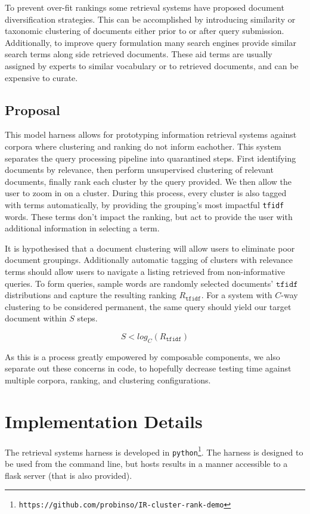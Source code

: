 \documentclass[11pt]{article}
\def\site{\texttt{https://github.com/probinso/IR-cluster-rank-demo}\xspace}
\def\tfidf{\texttt{tfidf}\xspace}
\def\python{\texttt{python}\xspace}
\begin{document}
To prevent over-fit rankings some retrieval systems have proposed document diversification
strategies\cite{Zhu2014}. This can be accomplished by introducing similarity or
taxonomic clustering of documents either prior to or after query submission. Additionally,
to improve query formulation many search engines provide similar search terms along side
retrieved documents. These aid terms are usually assigned by experts to similar vocabulary
or to retrieved documents, and can be expensive to curate.

\subsection{Proposal}
This model harness allows for prototyping information retrieval systems against
corpora where clustering and ranking do not inform eachother.
This system separates the query processing pipeline into quarantined
steps. First identifying documents by relevance, then perform unsupervised clustering
of relevant documents, finally rank each cluster by the query provided. We then allow
the user to zoom in on a cluster. During this process, every cluster is also tagged with
terms automatically, by providing the grouping's most impactful \tfidf words. These terms
don't impact the ranking, but act to provide the user with additional information in
selecting a term.

It is hypothesised that a document clustering will allow users to eliminate poor document
groupings. Additionally automatic tagging of clusters with relevance terms should allow
users to navigate a listing retrieved from non-informative queries. To form queries,
sample words are randomly selected documents' $\tfidf$ distributions and capture the
resulting ranking $R_\tfidf$. For a system with $C$-way clustering to be considered
permanent, the same query should yield our target document within $S$ steps.

\[S < log_C (R_\tfidf)\]

As this is a process greatly empowered by composable components, we also separate out
these concerns in code, to hopefully decrease testing time against multiple corpora,
ranking, and clustering configurations.


\section{Implementation Details}
The retrieval systems harness is developed in \python\footnote{\site}. The
harness is designed to be used from the command line, but hosts results in a manner
accessible to a flask server (that is also provided).
\end{document}
